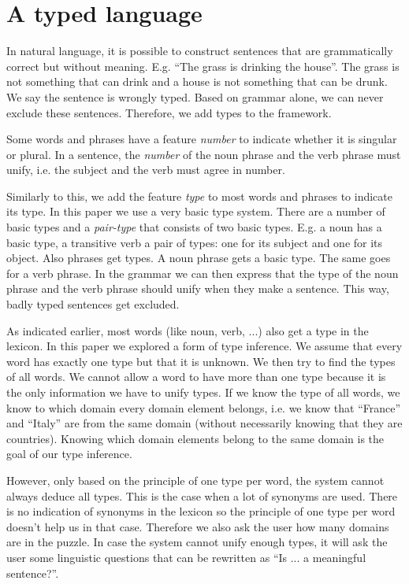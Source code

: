 \section{A typed language}
In natural language, it is possible to construct sentences that are grammatically correct but without meaning. E.g. ``The grass is drinking the house''. The grass is not something that can drink and a house is not something that can be drunk. We say the sentence is wrongly typed. Based on grammar alone, we can never exclude these sentences. Therefore, we add types to the framework.

Some words and phrases have a feature \textit{number} to indicate whether it is singular or plural. In a sentence, the \textit{number} of the noun phrase and the verb phrase must unify, i.e. the subject and the verb must agree in number.

Similarly to this, we add the feature \textit{type} to most words and phrases to indicate its type. In this paper we use a very basic type system. There are a number of basic types and a \textit{pair-type} that consists of two basic types. E.g. a noun has a basic type, a transitive verb a pair of types: one for its subject and one for its object. Also phrases get types. A noun phrase gets a basic type. The same goes for a verb phrase. In the grammar we can then express that the type of the noun phrase and the verb phrase should unify when they make a sentence. This way, badly typed sentences get excluded.

As indicated earlier, most words (like noun, verb, ...) also get a type in the lexicon. In this paper we explored a form of type inference. We assume that every word has exactly one type but that it is unknown. We then try to find the types of all words. We cannot allow a word to have more than one type because it is the only information we have to unify types. If we know the type of all words, we know to which domain every domain element belongs, i.e. we know that ``France'' and ``Italy'' are from the same domain (without necessarily knowing that they are countries). Knowing which domain elements belong to the same domain is the goal of our type inference.

However, only based on the principle of one type per word, the system cannot always deduce all types. This is the case when a lot of synonyms are used. There is no indication of synonyms in the lexicon so the principle of one type per word doesn't help us in that case. Therefore we also ask the user how many domains are in the puzzle. In case the system cannot unify enough types, it will ask the user some linguistic questions that can be rewritten as ``Is ... a meaningful sentence?''.

